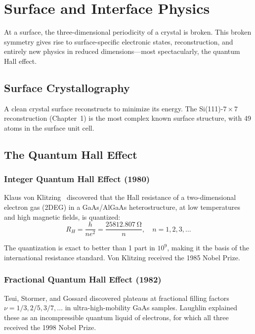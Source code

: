 \chapter{Surface and Interface Physics}

At a surface, the three-dimensional periodicity of a crystal is broken. This broken symmetry gives rise to surface-specific electronic states, reconstruction, and entirely new physics in reduced dimensions---most spectacularly, the quantum Hall effect.

\section{Surface Crystallography}

A clean crystal surface reconstructs to minimize its energy. The Si(111)-$7\times7$ reconstruction (Chapter~1) is the most complex known surface structure, with 49 atoms in the surface unit cell.

\section{The Quantum Hall Effect}

\subsection{Integer Quantum Hall Effect (1980)}

Klaus von Klitzing~\cite{klitzing1986qhe} discovered that the Hall resistance of a two-dimensional electron gas (2DEG) in a GaAs/AlGaAs heterostructure, at low temperatures and high magnetic fields, is quantized:
\begin{equation}
  R_H = \frac{h}{ne^2} = \frac{\SI{25812.807}{\ohm}}{n}, \quad n = 1, 2, 3, \ldots
\end{equation}

The quantization is exact to better than 1 part in $10^{9}$, making it the basis of the international resistance standard. Von Klitzing received the 1985 Nobel Prize.

\subsection{Fractional Quantum Hall Effect (1982)}

Tsui, Stormer, and Gossard discovered plateaus at fractional filling factors $\nu = 1/3, 2/5, 3/7, \ldots$ in ultra-high-mobility GaAs samples. Laughlin explained these as an incompressible quantum liquid of electrons, for which all three received the 1998 Nobel Prize.

